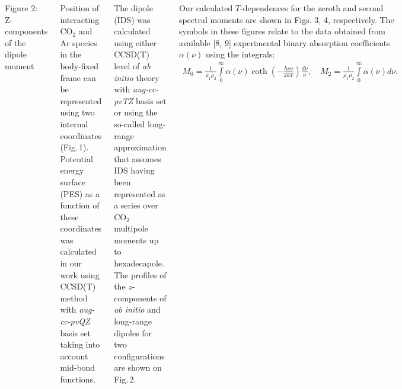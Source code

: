\documentclass[
  20pt,
  a0paper,
  portrait,
  margin=0mm,
  innermargin=15mm,
  blockverticalspace=0mm,
  colspace=0mm,
  subcolspace=0mm
]{tikzposter}
\newcommand{\lb}{\left(}
\newcommand{\rb}{\right)}
\newcommand{\vpravo}{\hspace{1.5cm}}
\newcommand{\vverh}{\vspace*{-0.05cm}}
\begin{document}
\begin{columns}
{{\begin{minipage}{0.6\linewidth}
\vspace{1cm}
\begin{tikzfigure}
		\includegraphics[width=\linewidth]{../pictures/dipole_pictures/last-crop.pdf}
\end{tikzfigure}
\begin{center}
\vspace*{-0.5cm}
Figure 2: Z-components of the dipole moment \label{fig:dipole}
\end{center}

\end{minipage}
\hspace{1cm}
\begin{minipage}{0.37\linewidth}
\vspace*{-3cm}
\vpravo Position of interacting CO$_2$ and Ar species in the body-fixed frame can be represented using two internal coordinates (Fig.\,1). Potential energy surface (PES) as a function of these coordinates was calculated in our work using CCSD(T) method with \textit{aug-cc-pvQZ} basis set taking into account mid-bond functions. \par 
\vpravo The dipole (IDS) was calculated using either CCSD(T) level of \textit{ab initio} theory with \textit{aug-cc-pvTZ} basis set or using the so-called long-range approximation that assumes IDS having been represented as a series over CO$_2$ multipole moments up to hexadecapole. The profiles of the $z$-components of \textit{ab initio} and long-range dipoles for two configurations are shown on Fig.\,2.
\end{minipage}

\vspace{0.5cm}
\vpravo Our calculated $T$-dependences for the zeroth and second spectral moments are shown in Figs. 3, 4, respectively. The symbols in these figures relate to the data obtained from available [8, 9] experimental binary absorption coefficients $\alpha(\nu)$ using the integrals:
\vverh
\begin{gather}
		M_0 = \frac{1}{\rho_1 \rho_2} \int\limits_{0}^{\infty} \alpha(\nu) \coth \lb - \frac{h c \nu}{2 k T} \rb \frac{d \nu}{\nu}, \quad M_2 = \frac{1}{\rho_1 \rho_2} \int\limits_{0}^{\infty} \alpha(\nu) d \nu. \label{eq:m2_spectra}
\end{gather}

}}
\end{columns}
\end{document}
